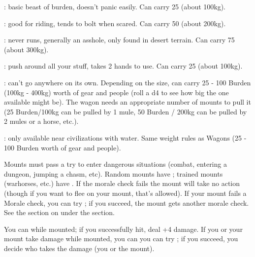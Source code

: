 
   
  : basic beast of burden, doesn't panic easily.  Can carry 25  (about 100kg).

  :   good for riding, tends to bolt when scared.  Can carry 50  (about 200kg).

  :  never runs, generally an asshole, only found in desert terrain.  Can carry 75  (about 300kg).

  :  push around all your stuff, takes 2 hands to use.  Can carry 25  (about 100kg).

  :  can't go anywhere on its own.  Depending on the size, can carry 25 - 100 Burden (100kg - 400kg) worth of gear and people (roll a d4 to see how big the one available might be).  The wagon needs an appropriate number of mounts to pull it (25 Burden/100kg can be pulled by 1 mule, 50 Burden / 200kg can be pulled by 2 mules or a horse, etc.).

  :  only available near civilizations with water.  Same weight rules as Wagons (25 - 100 Burden worth of gear and people).

\cbreak      

    
    Mounts must pass a  try to enter dangerous situations (combat, entering a dungeon, jumping a chasm, etc). Random mounts have ; trained mounts (warhorses, etc.) have .  If the morale check fails the mount will take no action (though if you want to flee on your mount, that's allowed). If your mount fails a Morale check, you can try ; if you succeed, the mount gets another morale check. See the section on  under the  section.

    You can  while mounted; if you successfully hit, deal +4 damage.  If you or your mount take damage while mounted, you can you can try ; if you succeed, you decide who takes the damage (you or the mount).


